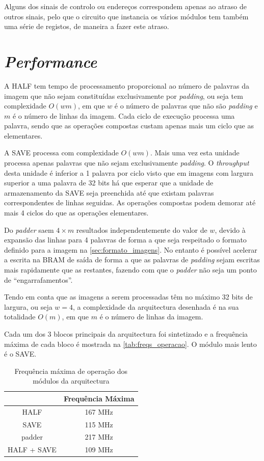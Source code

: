 \documentclass[a4paper]{article}
\begin{document}
Alguns dos sinais de controlo ou endereços correspondem apenas ao atraso de outros sinais, pelo que o circuito que instancia os vários módulos tem também uma série de registos, de maneira a fazer este atraso.

\section{\textit{Performance}}	%

A HALF tem tempo de processamento proporcional ao número de palavras da imagem que não sejam constituídas exclusivamente por \textit{padding}, ou seja tem complexidade $O(w m)$, em que $w$ é o número de palavras que não são \textit{padding} e $m$ é o número de linhas da imagem. Cada ciclo de execução processa uma palavra, sendo que as operações compostas custam apenas mais um ciclo que as elementares.

A SAVE processa com complexidade $O(w m)$. Mais uma vez esta unidade processa apenas palavras que não sejam exclusivamente \textit{padding}. O \textit{throughput} desta unidade é inferior a 1 palavra por ciclo visto que em imagens com largura superior a uma palavra de 32 bits há que esperar que a unidade de armazenamento da SAVE seja preenchida até que existam palavras correspondentes de linhas seguidas. As operações compostas podem demorar até mais 4 ciclos do que as operações elementares.

Do \textit{padder} saem $4\times m$ resultados independentemente do valor de $w$, devido à expansão das linhas para 4 palavras de forma a que seja respeitado o formato definido para a imagem na \autoref{sec:formato_imagens}. No entanto é possível acelerar a escrita na BRAM de saída de forma a que as palavras de \textit{padding} sejam escritas mais rapidamente que as restantes, fazendo com que o \textit{padder} não seja um ponto de ``engarrafamentos''.

Tendo em conta que as imagens a serem processadas têm no máximo 32 bits de largura, ou seja $w=4$, a complexidade da arquitectura desenhada é na sua totalidade $O(m)$, em que $m$ é o número de linhas da imagem.

Cada um dos 3 blocos principais da arquitectura foi sintetizado e a frequência máxima de cada bloco é mostrada na \autoref{tab:freqs_operacao}. O módulo mais lento é o SAVE.

\begin{table}
\centering
\begin{tabular}{|c|c|}
\cline{2-2}
\multicolumn{1}{c|}{} & Frequência Máxima \\ 
\cline{2-2}
\hline
HALF & 167 MHz \\ 
\hline 
SAVE & 115 MHz \\ 
\hline 
padder & 217 MHz \\ 
\hline 
HALF + SAVE & 109 MHz \\ 
\hline 
\end{tabular} 
\caption{Frequência máxima de operação dos módulos da arquitectura}
\label{tab:freqs_operacao}
\end{table}
\end{document}
